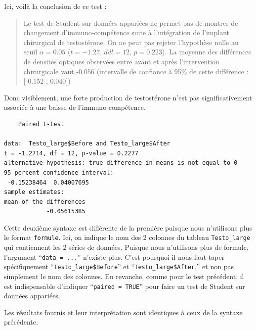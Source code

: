 \documentclass[
  a4paper,
]{article}
\newenvironment{Shaded}{\begin{snugshade}}{\end{snugshade}}
\newcommand{\AttributeTok}[1]{\textcolor[rgb]{0.00,0.34,0.68}{#1}}
\newcommand{\CommentTok}[1]{\textcolor[rgb]{0.54,0.53,0.53}{#1}}
\newcommand{\ConstantTok}[1]{\textcolor[rgb]{0.67,0.33,0.00}{#1}}
\newcommand{\FunctionTok}[1]{\textcolor[rgb]{0.39,0.29,0.61}{#1}}
\newcommand{\NormalTok}[1]{\textcolor[rgb]{0.12,0.11,0.11}{#1}}
\newcommand{\SpecialCharTok}[1]{\textcolor[rgb]{0.24,0.68,0.91}{#1}}
\begin{document}
Ici, voilà la conclusion de ce test :

\begin{quote}
Le test de Student sur données appariées ne permet pas de montrer de changement d'immuno-compétence suite à l'intégration de l'implant chirurgical de testostérone. On ne peut pas rejeter l'hypothèse nulle au seuil \(\alpha = 0.05\) (\(t = -1.27\), \(ddl = 12\), \(p = 0.223\)). La moyenne des différences de densités optiques observées entre avant et après l'intervention chirurgicale vaut -0.056 (intervalle de confiance à 95\% de cette différence : {[}-0.152 ; 0.040{]})
\end{quote}

Donc visiblement, une forte production de testostérone n'est pas significativement associée à une baisse de l'immuno-compétence.

\begin{Shaded}
\end{Shaded}

\begin{verbatim}
    Paired t-test

data:  Testo_large$Before and Testo_large$After
t = -1.2714, df = 12, p-value = 0.2277
alternative hypothesis: true difference in means is not equal to 0
95 percent confidence interval:
 -0.15238464  0.04007695
sample estimates:
mean of the differences 
            -0.05615385 
\end{verbatim}

Cette deuxième syntaxe est différente de la première puisque nous n'utilisons plus le format \texttt{formule}. Ici, on indique le nom des 2 colonnes du tableau \texttt{Testo\_large} qui contiennent les 2 séries de données. Puisque nous n'utilisons plus de formule, l'argument ``\texttt{data\ =\ ...}'' n'existe plus. C'est pourquoi il nous faut taper spécifiquement ``\texttt{Testo\_large\$Before}'' et ``\texttt{Testo\_large\$After},'' et non pas simplement le nom des colonnes. En revanche, comme pour le test précédent, il est indispensable d'indiquer ``\texttt{paired\ =\ TRUE}'' pour faire un test de Student sur données appariées.

Les résultats fournis et leur interprétation sont identiques à ceux de la syntaxe précédente.
\end{document}
